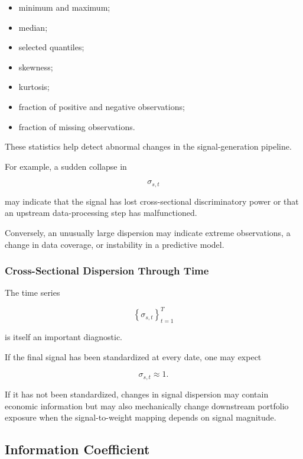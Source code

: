 \documentclass[11pt,a4paper]{article}
\begin{document}
\begin{itemize}
    \item minimum and maximum;
    \item median;
    \item selected quantiles;
    \item skewness;
    \item kurtosis;
    \item fraction of positive and negative observations;
    \item fraction of missing observations.
\end{itemize}

These statistics help detect abnormal changes in the signal-generation
pipeline.

For example, a sudden collapse in

\begin{equation}
\sigma_{s,t}
\end{equation}

may indicate that the signal has lost cross-sectional discriminatory power or
that an upstream data-processing step has malfunctioned.

Conversely, an unusually large dispersion may indicate extreme observations,
a change in data coverage, or instability in a predictive model.


\subsubsection{Cross-Sectional Dispersion Through Time}

The time series

\begin{equation}
\left\{
\sigma_{s,t}
\right\}_{t=1}^{T}
\end{equation}

is itself an important diagnostic.

If the final signal has been standardized at every date, one may expect

\begin{equation}
\sigma_{s,t}
\approx 1.
\end{equation}

If it has not been standardized, changes in signal dispersion may contain
economic information but may also mechanically change downstream portfolio
exposure when the signal-to-weight mapping depends on signal magnitude.


\subsection{Information Coefficient}
\label{subsec:information_coefficient}
\end{document}

